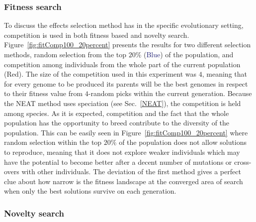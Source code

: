 \subsubsection*{Fitness search}

To discuss the effects selection method has in the specific evolutionary setting, competition is used in both fitness based and novelty search. Figure~\ref{fig:fitComp100_20percent} presents the results for two different selection methods, random selection from the top $20\%$ (\textcolor{MidnightBlue}{Blue}) of the population, and competition among individuals from the whole part of the current population (\textcolor{BrickRed}{Red}). The size of the competition used in this experiment was $4$, meaning that for every genome to be produced its parents will be the best genomes in respect to their fitness value from $4$-random picks within the current generation. Because the NEAT method uses speciation (see Sec.~\ref{NEAT}), the competition is held among species. As it is expected, competition and the fact that the whole population has the opportunity to breed contribute to the diversity of the population. This can be easily seen in Figure~\ref{fig:fitComp100_20percent} where random selection within the top $20\%$ of the population does not allow solutions to reproduce, meaning that it does not explore weaker individuals which may have the potential to become better after a decent number of mutations or cross-overs with other individuals. The deviation of the first method gives a perfect clue about how narrow is the fitness landscape at the converged area of search when only the best solutions survive on each generation.

\subsubsection*{Novelty search}

